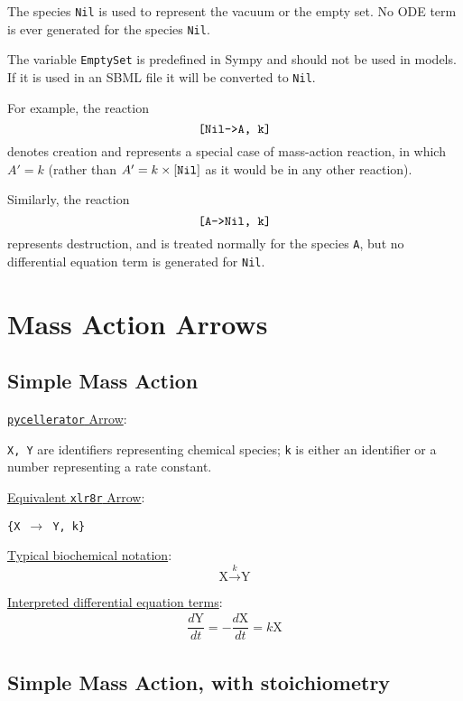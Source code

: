The species {\tt Nil} is used to represent the vacuum or the empty set. No ODE term is ever generated for the species {\tt Nil}. 

The variable {\tt EmptySet} is predefined in Sympy and should not be used in models. If it is used in an SBML file it will be converted to {\tt Nil}. 


For example, the reaction
$$\text{\tt{[Nil->A, k]}}$$
denotes creation and represents a special case of mass-action reaction, in which $A'=k$ (rather than $A'=k\times\tt{[Nil]}$ as it would be in any other reaction). 

Similarly, the reaction
$$\text{\tt{[A->Nil, k]}}$$
represents destruction, and is treated normally for the species {\tt A}, but no differential equation term is generated for {\tt Nil}.
\section{Mass Action Arrows}

\subsection{Simple Mass Action}
\label{section:Simple-Mass-Action}

\underline{{\tt pycellerator} Arrow}: \begin{center}
\fbox{{\tt [X $->$ Y, k]}}
\end{center}

{\tt X, Y} are identifiers representing chemical species;  {\tt k} is either an identifier or a number representing a rate constant. 

\underline{Equivalent {\tt xlr8r} Arrow}: \begin{center}
{\tt \{X $\to$ Y, k\}}
\end{center}

\underline{Typical biochemical notation}: $$\text{X} \overset{k}{\to} \text{Y}$$

\underline{Interpreted differential equation terms}: 
\begin{align*}
\dfrac{d\text{Y}}{dt} = 
-\dfrac{d\text{X}}{dt} = k \text{X}
\end{align*}



\subsection{Simple Mass Action, with stoichiometry}
\label{section:simple-mass-action-stoich}



